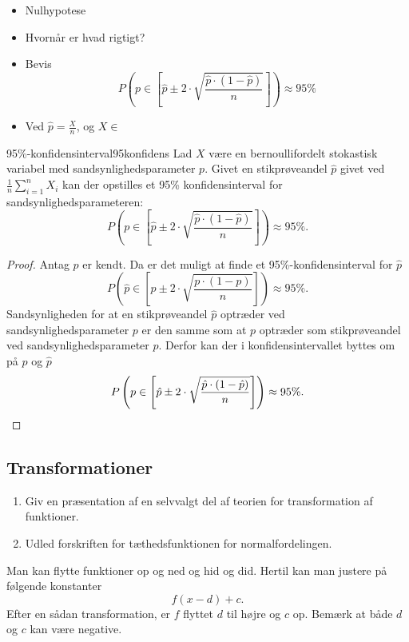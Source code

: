 \documentclass{article}
\begin{document}
\begin{itemize}
	\item Nulhypotese
	\item Hvornår er hvad rigtigt?
	\item Bevis
		\[
			P(p\in[\hat p \pm 2\cdot\sqrt{\frac{\hat p\cdot(1-\hat p)}{n}}]) \approx 95\%
		\]
	\item Ved $\hat p = \frac{X}{n}$, og $X \in $
\end{itemize}

\begin{theorem}{95\%-konfidensinterval}{95konfidens}
	Lad $X$ være en bernoullifordelt stokastisk variabel med
	sandsynlighedsparameter $p$. Givet en stikprøveandel $\hat{p}$ givet ved
	$\frac{1}{n}\sum_{i=1}^n X_i$ kan der opstilles et 95\% konfidensinterval
	for sandsynlighedsparameteren:
	\[
		P\left(p\in\left[\hat p \pm 2\cdot\sqrt{\frac{\hat p\cdot(1-\hat p)}{n}}\right]\right)
		\approx 95\%.
	\] 
\end{theorem}

\begin{proof}
	Antag $p$ er kendt. Da er det muligt at finde et 95\%-konfidensinterval for
	$\hat{p}$
	\[
		P\left(\hat{p}\in\left[p \pm 2\cdot\sqrt{\frac{p\cdot(1-p)}{n}}\right]\right)
		\approx 95\%.
	\] 
	Sandsynligheden for at en stikprøveandel $\hat{p}$ optræder ved
	sandsynlighedsparameter $p$ er den samme som at $p$ optræder som
	stikprøveandel ved sandsynlighedsparameter $\hat{p}$. Derfor kan der i
	konfidensintervallet byttes om på $p$ og $\hat{p}$
	\[
		P\left(p\in\left[\hat p \pm 2\cdot\sqrt{\frac{\hat p\cdot(1-\hat p)}{n}}\right]\right)
		\approx 95\%.\qedhere
	\] 
\end{proof}

\begin{tcolorbox}
	\section{Transformationer}
	\tcblower
	\begin{enumerate}
		\item Giv en præsentation af en selvvalgt del af teorien for transformation af funktioner.
		\item Udled forskriften for tæthedsfunktionen for normalfordelingen. 
	\end{enumerate}
\end{tcolorbox}

Man kan flytte funktioner op og ned og hid og did. Hertil kan man justere på
følgende konstanter
\[
	f(x - d) + c.
\] 
Efter en sådan transformation, er $f$ flyttet $d$ til højre og $c$ op. Bemærk
at både $d$ og $c$ kan være negative.
\end{document}
